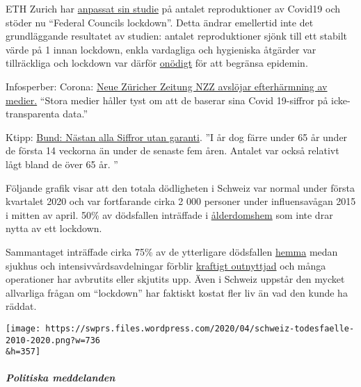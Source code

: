 ETH Zurich har
\href{https://www.nau.ch/politik/regional/coronavirus-eth-forscherin-passt-studie-an-und-stutzt-lockdown-65695817}{anpassat
sin studie} på antalet reproduktioner av Covid19 och stöder nu ``Federal
Councils lockdown''. Detta ändrar emellertid inte det grundläggande
resultatet av studien: antalet reproduktioner sjönk till ett stabilt
värde på 1 innan lockdown, enkla vardagliga och hygieniska åtgärder var
tillräckliga och lockdown var därför
\href{https://infekt.ch/2020/04/sind-wir-tatsaechlich-im-blindflug/}{onödigt}
för att begränsa epidemin.

Infosperber: Corona:
\href{https://www.infosperber.ch/Artikel/Medien/Corona-NZZ-deckt-das-Nachplappern-anderer-Medien-auf}{Neue
Züricher Zeitung NZZ avslöjar efterhärmning av medier.} ``Stora medier
håller tyst om att de baserar sina Covid 19-siffror på icke-transparenta
data.''

Ktipp:
\href{https://www.ktipp.ch/artikel/artikeldetail/bund-fast-alle-zahlen-ohne-gewaehr/}{Bund:
Nästan alla Siffror utan garanti}. ''I år dog färre under 65 år under de
första 14 veckorna än under de senaste fem åren. Antalet var också
relativt lågt bland de över 65 år. ''

Följande grafik visar att den totala dödligheten i Schweiz var normal
under första kvartalet 2020 och var fortfarande cirka 2 000 personer
under influensavågan 2015 i mitten av april. 50\% av dödsfallen
inträffade i
\href{https://www.nzz.ch/zuerich/coronavirus-zuerich-aendert-nun-das-testregime-in-heimenauch-viele-aeltere-covid-19-infizierte-entwickeln-keine-symptome-zuerich-aendert-nun-das-testregime-in-heimen-ld.1552089}{ålderdomshem}
som inte drar nytta av ett lockdown.

Sammantaget inträffade cirka 75\% av de ytterligare dödsfallen
\href{https://www.tagesspiegel.de/wissen/woran-sterben-corona-patienten-wirklich-ein-schweizer-forscher-macht-hoffnung-im-kampf-gegen-covid-19/25750666.html}{hemma}
medan sjukhus och intensivvårdsavdelningar förblir
\href{https://swprs.files.wordpress.com/2020/04/intensivbettenbelegung-schweiz-2020-04-14.png}{kraftigt
outnyttjad} och många operationer har avbrutits eller skjutits upp. Även
i Schweiz uppstår den mycket allvarliga frågan om ``lockdown'' har
faktiskt kostat fler liv än vad den kunde ha räddat.

\texttt{[image: https://swprs.files.wordpress.com/2020/04/schweiz-todesfaelle-2010-2020.png?w=736\\\&h=357]}

\hypertarget{politiska-meddelanden}{%
\subparagraph{\texorpdfstring{\textbf{Politiska
meddelanden}}{Politiska meddelanden}}\label{politiska-meddelanden}}

